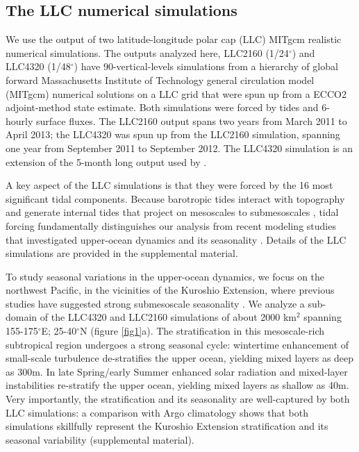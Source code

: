 \documentclass[grl]{agutex2015}
\begin{document}
\begin{article}
\section{The LLC numerical simulations}
We use the output of two latitude-longitude polar cap (LLC)
MITgcm realistic numerical simulations. The outputs
analyzed here, LLC2160 (1/24$^\circ$) and LLC4320 (1/48$^\circ$)  have
90-vertical-levels simulations from a hierarchy of global
forward Massachusetts Institute of Technology general circulation model (MITgcm)
numerical solutions on a LLC grid   \citep{forget_etal2015} that were
spun up from a ECCO2 adjoint-method state estimate. Both simulations were forced by
tides and 6-hourly surface fluxes. The LLC2160
output spans two years from March 2011 to April 2013; the LLC4320 was spun up from
the LLC2160 simulation, spanning one year from September 2011 to September 2012.
The LLC4320 simulation is an extension of the 5-month long output used by
\citet{rocha_etal2016}.

A key aspect of the LLC simulations is that they were forced by
the 16 most significant tidal components.
Because barotropic tides interact with topography and generate internal
tides that project on mesoscales to submesoscales
\citep[e.g., ][]{rocha_etal2016}, tidal forcing fundamentally distinguishes our analysis
from recent modeling studies that investigated upper-ocean dynamics
and its seasonality \citep{sasaki_etal2014,qiu_etal2014}. Details of the LLC simulations
are provided in the supplemental material.

To study seasonal variations in the upper-ocean dynamics, we focus on the northwest
Pacific, in the vicinities of the Kuroshio
Extension, where previous studies have suggested strong submesoscale seasonality
\citep{sasaki_etal2014,qiu_etal2014}.
We analyze a sub-domain of the LLC4320 and LLC2160 simulations of about 2000 km$^2$
spanning 155-175$^\circ$E; 25-40$^\circ$N (figure \ref{fig1}a). The stratification
in this mesoscale-rich subtropical region undergoes a strong seasonal cycle: wintertime
enhancement of small-scale turbulence de-stratifies the upper ocean, yielding mixed layers
as deep as 300m. In late Spring/early Summer enhanced solar radiation and mixed-layer
instabilities re-stratify the upper ocean, yielding mixed layers as shallow as 40m.
Very importantly, the stratification and its seasonality are well-captured by both LLC simulations:
a comparison with Argo climatology shows that both simulations skillfully represent the Kuroshio
Extension stratification and its seasonal variability  (supplemental material).


\end{article}
\end{document}
